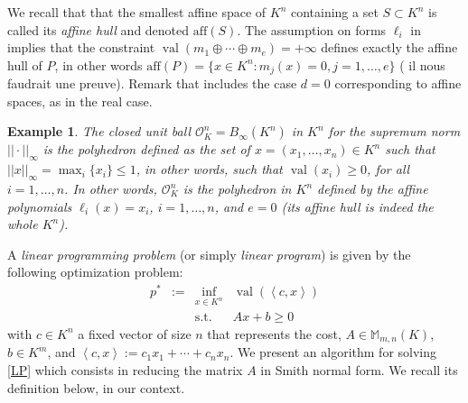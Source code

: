 \documentclass[a4paper,12pt]{article}
\newtheorem{example}{Example}
\newcommand{\allmat}{\mathbb{M}} %
\newcommand{\aff}[1]{{\text{aff}(#1)}} %
\newcommand{\relint}[1]{{\text{relint}(#1)}} %
\newcommand{\simone}[1]{{\color{blue} #1}} %
\DeclareMathOperator{\val}{val}
\newcommand{\OK}{\mathcal{O}_K}
\begin{document}
We recall that that the smallest affine space of $K^n$ containing a set $S \subset K^n$ is called its
\emph{affine hull} and denoted $\aff{S}$.
The assumption on forms $\ell_i$ in  implies that the constraint
$\val(m_1 \oplus \cdots \oplus m_e) = +\infty$ defines exactly the affine hull of $P$, in other words
$\aff{P} = \{x \in K^n : m_j(x) = 0,
j=1,\ldots,e\}$ (\simone{il nous faudrait une preuve}).
Remark that  includes the case $d=0$ corresponding to affine spaces, as in the real case.

\begin{example}
  The \emph{closed unit ball} $\OK^n=B_\infty(K^n)$ in $K^n$ for the supremum norm $||\cdot||_{\infty}$ is the
  polyhedron defined as the set of $x=(x_1,\ldots,x_n) \in K^n$ such that $||x||_{\infty} =
  \max_i\{x_i\} \leq 1$, in other words, such that $\val(x_i) \geq 0$, for all $i=1, \ldots, n$.
  In other words, $\OK^n$ is the polyhedron in $K^n$ defined by the affine polynomials
  $\ell_i(x)=x_i$, $i=1,\ldots, n$, and $e=0$ (its affine hull is indeed the whole $K^n$).
\end{example}

A \emph{linear programming problem} (or simply \emph{linear program}) is given by the following
optimization problem:
\begin{equation}
  \tag{LP}\label{LP}
\begin{array}{rcll}
  p^* & := & \inf_{x \in K^n} & \val(\left\langle c, x \right\rangle) \\
  &    & \text{s.t.}         & A x + b \geq 0
\end{array}
\end{equation}
with $c \in K^n$ a fixed vector of size $n$ that represents the cost, $A \in \allmat_{m,n}(K)$, $b \in K^m$,
and $\left\langle c, x \right\rangle := c_1x_1+\cdots +c_nx_n$.
We present an algorithm for solving \eqref{LP} which consists in reducing the matrix $A$ in Smith normal form.
We recall its definition below, in our context.
\end{document}
